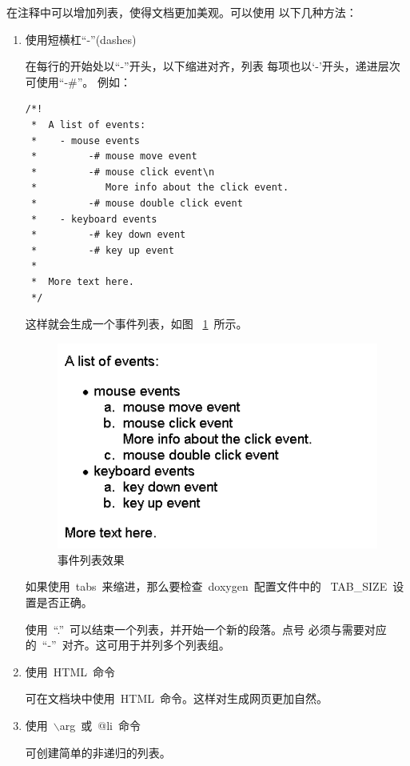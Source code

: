 在注释中可以增加列表，使得文档更加美观。可以使用
以下几种方法：
\begin{enumerate}
    \item 使用短横杠``-''(dashes)

在每行的开始处以“-”开头，以下缩进对齐，列表
每项也以`-'开头，递进层次可使用``-\#''。
例如：
\ttfamily
\begin{lstlisting}
/*!
 *  A list of events:
 *    - mouse events
 *         -# mouse move event
 *         -# mouse click event\n
 *            More info about the click event.
 *         -# mouse double click event
 *    - keyboard events
 *         -# key down event
 *         -# key up event
 *
 *  More text here.
 */
\end{lstlisting}
这样就会生成一个事件列表，如图
~\ref{pic:design:list}~所示。

\begin{figure}[ht]
    \centerline{
        \includegraphics[width= 4 in]{part-basic/chapter-design/pic/design_doc_list.png}
    }
    \caption{事件列表效果\label{pic:design:list}}
\end{figure}

如果使用~tabs~来缩进，那么要检查~doxygen~配置文件中的
~TAB\_SIZE~设置是否正确。

使用~``.''~可以结束一个列表，并开始一个新的段落。点号
必须与需要对应的~``-''~对齐。这可用于并列多个列表组。

    \item 使用~HTML~命令

可在文档块中使用~HTML~命令。这样对生成网页更加自然。

    \item 使用~$\backslash$arg~或~@li~命令

可创建简单的非递归的列表。
\end{enumerate}


